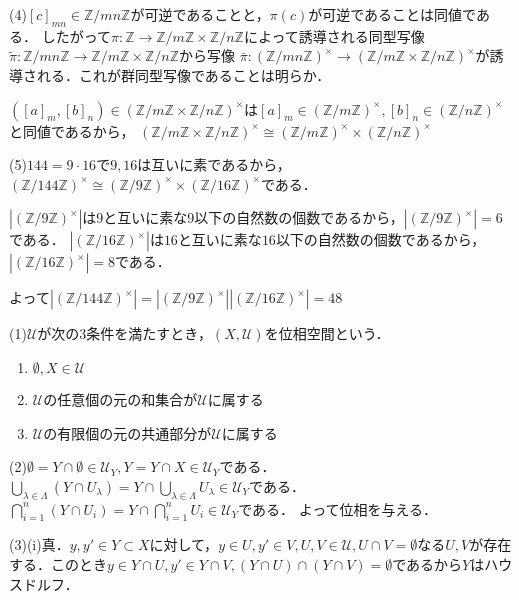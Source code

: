 \documentclass[
		book,
		head_space=20mm,
		foot_space=20mm,
		gutter=10mm,
		line_length=190mm
]{jlreq}
\begin{document}
(4)$[c]_{mn} \in \mathbb{Z}/ mn \mathbb{Z}$が可逆であることと，$\pi(c)$が可逆であることは同値である．
したがって$\pi\colon \mathbb{Z}\rightarrow \mathbb{Z}/m \mathbb{Z} \times \mathbb{Z}/n \mathbb{Z}$によって誘導される同型写像$\tilde{\pi}\colon \mathbb{Z}/mn \mathbb{Z} \rightarrow \mathbb{Z}/m \mathbb{Z} \times \mathbb{Z}/n \mathbb{Z}$から写像
$\bar{\pi} \colon (\mathbb{Z}/mn \mathbb{Z})^{\times} \rightarrow (\mathbb{Z}/m \mathbb{Z} \times \mathbb{Z}/n \mathbb{Z})^{\times}$が誘導される．これが群同型写像であることは明らか．

$([a]_m , [b]_n) \in (\mathbb{Z}/m \mathbb{Z} \times \mathbb{Z}/n \mathbb{Z})^{\times}$は$[a]_m \in (\mathbb{Z}/m \mathbb{Z})^{\times},[b]_n \in (\mathbb{Z}/n \mathbb{Z})^{\times}$と同値であるから，
$(\mathbb{Z}/m \mathbb{Z} \times \mathbb{Z}/n \mathbb{Z})^{\times} \cong (\mathbb{Z}/m \mathbb{Z})^{\times} \times (\mathbb{Z}/n \mathbb{Z})^{\times}$

(5)$144=9 \cdot 16$で$9,16$は互いに素であるから，$(\mathbb{Z}/144 \mathbb{Z})^{\times} \cong (\mathbb{Z}/9 \mathbb{Z})^{\times} \times (\mathbb{Z}/16 \mathbb{Z})^{\times}$である．

$|(\mathbb{Z}/9 \mathbb{Z})^{\times}|$は$9$と互いに素な$9$以下の自然数の個数であるから，$|(\mathbb{Z}/9 \mathbb{Z})^{\times}|=6$である．
$|(\mathbb{Z}/16 \mathbb{Z})^{\times}|$は$16$と互いに素な$16$以下の自然数の個数であるから，$|(\mathbb{Z}/16 \mathbb{Z})^{\times}|=8$である．

よって$|(\mathbb{Z}/144 \mathbb{Z})^{\times}|=|(\mathbb{Z}/9 \mathbb{Z})^{\times}||(\mathbb{Z}/16 \mathbb{Z})^{\times}|=48$

(1)$\mathcal{U}$が次の3条件を満たすとき，$(X,\mathcal{U})$を位相空間という．
\begin{enumerate}
    \item $\emptyset,X \in \mathcal{U}$
    \item $\mathcal{U}$の任意個の元の和集合が$\mathcal{U}$に属する
    \item $\mathcal{U}$の有限個の元の共通部分が$\mathcal{U}$に属する
\end{enumerate}

(2)$\emptyset = Y \cap \emptyset \in \mathcal{U}_Y,Y=Y\cap X \in \mathcal{U}_Y$である．
$\bigcup_{\lambda \in \Lambda}  (Y \cap U_{\lambda}) = Y \cap \bigcup_{\lambda \in \Lambda} U_{\lambda} \in \mathcal{U}_Y$である．
$\bigcap_{i=1}^n(Y \cap  U_i )=Y \cap \bigcap_{i=1}^n U_i \in \mathcal{U}_Y$である．
よって位相を与える．

(3)(i)真．$y,y' \in Y\subset X$に対して，$y\in U,y' \in V,U,V \in \mathcal{U},U\cap V = \emptyset$なる$U,V$が存在する．このとき$y \in Y \cap U,y' \in Y \cap V,(Y \cap U) \cap (Y \cap V) = \emptyset$であるから$Y$はハウスドルフ．
\end{document}
